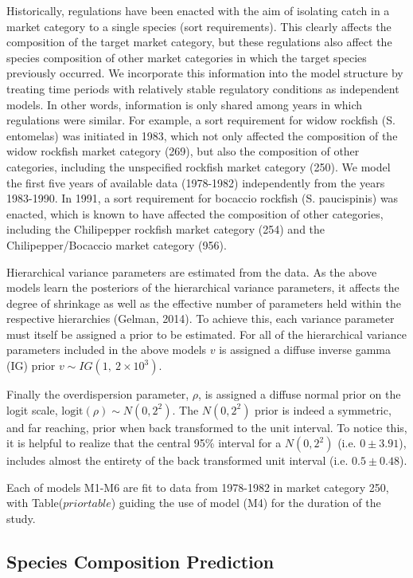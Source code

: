 \documentclass[12pt]{article}
\begin{document}
Historically, regulations have been enacted with the aim of isolating
catch in a market category to a single species (sort requirements). This
clearly affects the composition of the target market category, but these
regulations also affect the species composition of other market
categories in which the target species previously occurred. We
incorporate this information into the model structure by treating time
periods with relatively stable regulatory conditions as independent
models. In other words, information is only shared among years in which
regulations were similar. For example, a sort requirement for widow
rockfish (S. entomelas) was initiated in 1983, which not only affected
the composition of the widow rockfish market category (269), but also
the composition of other categories, including the unspecified rockfish
market category (250). We model the first five years of available data
(1978-1982) independently from the years 1983-1990. In 1991, a sort
requirement for bocaccio rockfish (S. paucispinis) was enacted, which is
known to have affected the composition of other categories, including
the Chilipepper rockfish market category (254) and the
Chilipepper/Bocaccio market category (956).

Hierarchical variance parameters are estimated from the data. As the
above models learn the posteriors of the hierarchical variance
parameters, it affects the degree of shrinkage as well as the effective
number of parameters held within the respective hierarchies (Gelman,
2014). To achieve this, each variance parameter must itself be assigned
a prior to be estimated. For all of the hierarchical variance parameters
included in the above models \(v\) is assigned a diffuse inverse gamma
(IG) prior \(v \sim IG(1,~2\times10^{3})\).

Finally the overdispersion parameter, \(\rho\), is assigned a diffuse
normal prior on the logit scale, \(\text{logit}(\rho) \sim N(0, 2^2)\).
The \(N(0, 2^2)\) prior is indeed a symmetric, and far reaching, prior
when back transformed to the unit interval. To notice this, it is
helpful to realize that the central 95\% interval for a \(N(0, 2^2)\)
(i.e. \(0\pm3.91\)), includes almost the entirety of the back
transformed unit interval (i.e. \(0.5\pm0.48\)).

Each of models M1-M6 are fit to data from 1978-1982 in market category
250, with Table(\(priortable\)) guiding the use of model (M4) for the
duration of the study.

\subsection{Species Composition
Prediction}\label{species-composition-prediction}
\end{document}
